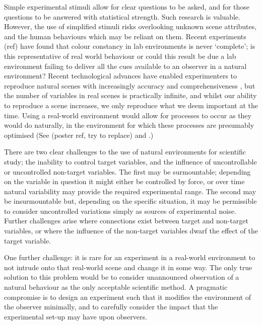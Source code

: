 Simple experimental stimuli allow for clear questions to be asked, and for those questions to be answered with statistical strength. Such research is valuable. However, the use of simplified stimuli risks overlooking unknown scene attributes, and the human behaviours which may be reliant on them. Recent experiments (ref) have found that colour constancy in lab environments is never ‘complete’; is this representative of real world behaviour or could this result be due a lab environment failing to deliver all the cues available to an observer in a natural environment? Recent technological advances have enabled experimenters to reproduce natural scenes with increasingly accuracy and comprehensiveness \citep{heasly_rendertoolbox3_2014}, but the number of variables in real scenes is practically infinite, and whilst our ability to reproduce a scene increases, we only reproduce what we deem important at the time. Using a real-world environment would allow for processes to occur as they would do naturally, in the environment for which these processes are presumably optimised (See \citet{kelly_chips_2017} (poster ref, try to replace) and \citet{shepard_perceptual_1992}.)

There are two clear challenges to the use of natural environments for scientific study; the inability to control target variables, and the influence of uncontrollable or uncontrolled non-target variables. The first may be surmountable; depending on the variable in question it might either be controlled by force, or over time natural variability may provide the required experimental range. The second may be insurmountable but, depending on the specific situation, it may be permissible to consider uncontrolled variations simply as sources of experimental noise. Further challenges arise where connections exist between target and non-target variables, or where the influence of the non-target variables dwarf the effect of the target variable.

One further challenge: it is rare for an experiment in a real-world environment to not intrude onto that real-world scene and change it in some way. The only true solution to this problem would be to consider unannounced observation of a natural behaviour as the only acceptable scientific method. A pragmatic compromise is to design an experiment such that it modifies the environment of the observer minimally, and to carefully consider the impact that the experimental set-up may have upon observers.

